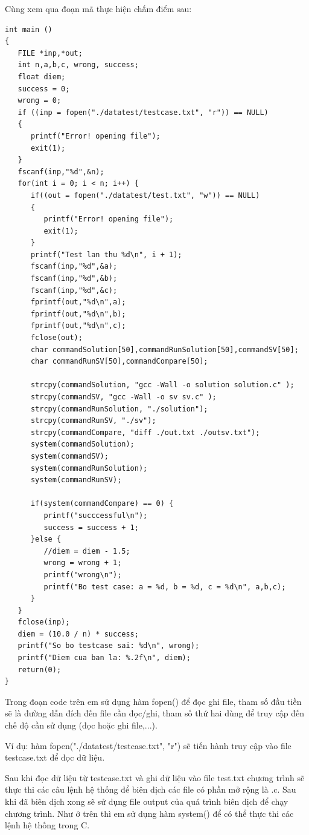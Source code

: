 \documentclass[12pt,a4paper]{report}
\begin{document}
Cùng xem qua đoạn mã thực hiện chấm điểm sau:

\begin{lstlisting}
int main ()
{
   FILE *inp,*out;
   int n,a,b,c, wrong, success;
   float diem;
   success = 0;
   wrong = 0;
   if ((inp = fopen("./datatest/testcase.txt", "r")) == NULL)
   {
      printf("Error! opening file");
      exit(1);         
   }
   fscanf(inp,"%d",&n);
   for(int i = 0; i < n; i++) {
      if((out = fopen("./datatest/test.txt", "w")) == NULL)
      {
         printf("Error! opening file");
         exit(1);         
      }
      printf("Test lan thu %d\n", i + 1);
      fscanf(inp,"%d",&a);
      fscanf(inp,"%d",&b);
      fscanf(inp,"%d",&c);
      fprintf(out,"%d\n",a);
      fprintf(out,"%d\n",b);
      fprintf(out,"%d\n",c);
      fclose(out);
      char commandSolution[50],commandRunSolution[50],commandSV[50];
      char commandRunSV[50],commandCompare[50];

      strcpy(commandSolution, "gcc -Wall -o solution solution.c" );
      strcpy(commandSV, "gcc -Wall -o sv sv.c" );
      strcpy(commandRunSolution, "./solution");
      strcpy(commandRunSV, "./sv");
      strcpy(commandCompare, "diff ./out.txt ./outsv.txt");
      system(commandSolution);
      system(commandSV);
      system(commandRunSolution);
      system(commandRunSV);

      if(system(commandCompare) == 0) {
         printf("succcessful\n");
         success = success + 1;
      }else {
         //diem = diem - 1.5;
         wrong = wrong + 1;
         printf("wrong\n");
         printf("Bo test case: a = %d, b = %d, c = %d\n", a,b,c);
      }
   }
   fclose(inp);
   diem = (10.0 / n) * success;
   printf("So bo testcase sai: %d\n", wrong);
   printf("Diem cua ban la: %.2f\n", diem);
   return(0);
}
\end{lstlisting}

Trong đoạn code trên em sử dụng hàm fopen() để đọc ghi file, tham số đầu tiền sẽ là đường dẫn đích đến file cần đọc/ghi, tham số thứ hai dùng để truy cập đến chế độ cần sử dụng (đọc hoặc ghi file,...).

Ví dụ: hàm fopen("./datatest/testcase.txt", "r") sẽ tiến hành truy cập vào file testcase.txt để đọc dữ liệu.

Sau khi đọc dữ liệu từ testcase.txt và ghi dữ liệu vào file test.txt chương trình sẽ thực thi các câu lệnh hệ thống để biên dịch các file có phần mở rộng là .c. Sau khi đã biên dịch xong sẽ sử dụng file output của quá trình biên dịch để chạy chương trình. Như ở trên thì em sử dụng hàm system() để có thể thực thi các lệnh hệ thống trong C.
\end{document}
